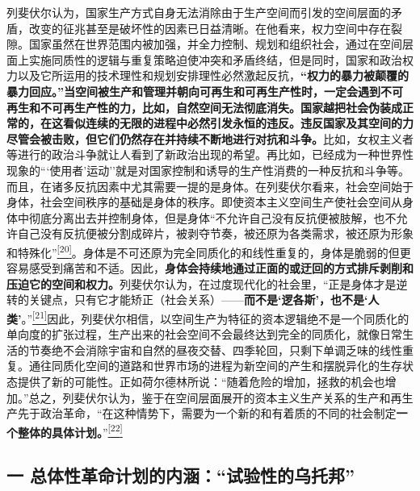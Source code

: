 \documentclass[UTF8, fontset = sourcesans, a4paper, oneside, zihao =
-4, scheme=chinese, no-math, space=true]{ctexbook}
\begin{document}
列斐伏尔认为，国家生产方式自身无法消除由于生产空间而引发的空间层面的矛盾，改变的征兆甚至是破坏性的因素已日益清晰。在他看来，权力空间中存在裂隙。国家虽然在世界范围内被加强，并全力控制、规划和组织社会，通过在空间层面上实施同质性的逻辑与重复策略迫使冲突和矛盾终结，但是同时，国家和政治权力以及它所运用的技术理性和规划安排理性必然激起反抗，\textbf{``权力的暴力被颠覆的暴力回应。''当空间被生产和管理并朝向可再生和可再生产性时，一定会遇到不可再生和不可再生产性的力，比如，自然空间无法彻底消失。国家越把社会伪装成正常的，在这看似连续的无限的进程中必然引发永恒的违反。违反国家及其空间的力尽管会被击败，但它们仍然存在并持续不断地进行对抗和斗争。}比如，女权主义者等进行的政治斗争就让人看到了新政治出现的希望。再比如，已经成为一种世界性现象的```使用者'运动''就是对国家控制和诱导的生产性消费的一种反抗和斗争等。而且，在诸多反抗因素中尤其需要一提的是身体。在列斐伏尔看来，社会空间始于身体，社会空间秩序的基础是身体的秩序。即使资本主义空间生产使社会空间从身体中彻底分离出去并控制身体，但是身体``不允许自己没有反抗便被肢解，也不允许自己没有反抗便被分割成碎片，被剥夺节奏，被还原为各类需求，被还原为形象和特殊化''\protect\hypertarget{part0008_split_002.htmlux5cux23w20}{}{}\protect\hyperlink{part0008_split_003.htmlux5cux23m20}{\textsuperscript{{[}20{]}}}。身体是不可还原为完全同质化的和线性重复的，身体是脆弱的但更容易感受到痛苦和不适。因此，\textbf{身体会持续地通过正面的或迂回的方式排斥剥削和压迫它的空间和权力。}列斐伏尔认为，在过度现代化的社会里，``正是身体才是逆转的关键点，只有它才能矫正（社会关系）------\textbf{而不是`逻各斯'，也不是`人类'}。''\protect\hypertarget{part0008_split_002.htmlux5cux23w21}{}{}\protect\hyperlink{part0008_split_003.htmlux5cux23m21}{\textsuperscript{{[}21{]}}}因此，列斐伏尔相信，以空间生产为特征的资本逻辑绝不是一个同质化的单向度的扩张过程，生产出来的社会空间不会最终达到完全的同质化，就像日常生活的节奏绝不会消除宇宙和自然的昼夜交替、四季轮回，只剩下单调乏味的线性重复。通往同质化空间的道路和世界市场的进程为新空间的产生和摆脱异化的生存状态提供了新的可能性。正如荷尔德林所说：``随着危险的增加，拯救的机会也增加。''总之，列斐伏尔认为，鉴于在空间层面展开的资本主义生产关系的生产和再生产先于政治革命，``在这种情势下，需要为一个新的和有着质的不同的社会制定\textbf{一个整体的具体计划。}''\protect\hypertarget{part0008_split_002.htmlux5cux23w22}{}{}\protect\hyperlink{part0008_split_003.htmlux5cux23m22}{\textsuperscript{{[}22{]}}}

\subsection{\texorpdfstring{一
总体性革命计划的内涵：``试验性的乌托邦''}{一 总体性革命计划的内涵：试验性的乌托邦}}\label{part0008_split_002.htmlux5cux23c039}
\end{document}
